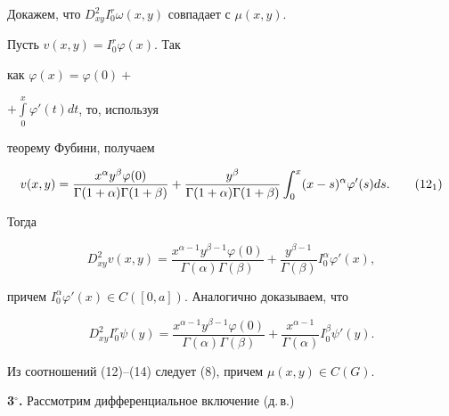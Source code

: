 \begin{pf}
\begin{equation}
\end{equation} 


Докажем, что $D^2_{xy}I_0^r\omega(x,y)$ совпадает с $\mu(x,y)$. 


Пусть $v(x,y)=I_0^r\varphi(x)$. Так 


как $\varphi(x)=\varphi(0)+$\linebreak %


$+\int\limits_0^x\varphi'(t)dt$, то, используя 


теорему Фубини, получаем 


\begin{equation} 


v(x,y)=\frac{x^\alpha y^\beta\varphi(0)} 


{\Gamma(1+\alpha)\Gamma(1+\beta)}+ 


\frac{y^\beta}{\Gamma(1+\alpha)\Gamma(1+\beta)}\int_0^x 


(x-s)^\alpha\varphi'(s)ds.\tag{12${}_1$} 


\end{equation} 


Тогда 


\begin{equation} 


D^2_{xy}v(x,y)= 


\frac{x^{\alpha-1}y^{\beta-1}\varphi(0)}{\Gamma(\alpha)\Gamma(\beta)} 


+\frac{y^{\beta-1}}{\Gamma(\beta)}I_0^\alpha\varphi'(x),\tag{13} 


\end{equation} 


причем $I_0^\alpha\varphi'(x)\in C([0,a])$. Аналогично доказываем, что 


\begin{equation} 


D^2_{xy}I_0^r\psi(y)= 


\frac{x^{\alpha-1}y^{\beta-1}\varphi(0)}{\Gamma(\alpha)\Gamma(\beta)} 


+\frac{x^{\alpha-1}}{\Gamma(\alpha)}I_0^\beta\psi'(y).\tag{14} 


\end{equation} 


Из соотношений (12)--(14) следует (8), причем $\mu(x,y)\in C(G)$. 


\end{pf} 


 


{\bf 3${}^\circ$.} Рассмотрим дифференциальное включение (д.\,в.) 


